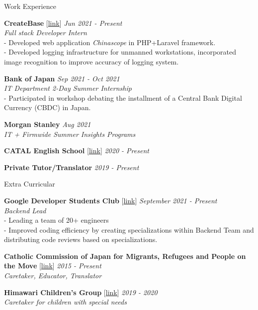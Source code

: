 \documentclass{resume} %
\begin{document}
\begin{rSection}{Work Experience}

{\bf CreateBase }[\href{https://createbase.work/}{link}] \hfill {\em Jun 2021 - Present} \\
{\textit{Full stack Developer Intern }}
\\- Developed web application \textit{Chinascope} in PHP+Laravel framework. 
\\- Developed logging infrastructure for unmanned workstations, incorporated image recognition to improve accuracy of logging system. 

{\bf Bank of Japan} \hfill {\em Sep 2021 - Oct 2021} \\
{\textit{IT Department 2-Day Summer Internship}}
\\- Participated in workshop debating the installment of a Central Bank Digital Currency (CBDC) in Japan.

{\bf Morgan Stanley} \hfill {\em Aug 2021} \\
{\textit{IT + Firmwide Summer Insights Programs}}

{\bf CATAL English School }[\href{https://catal.jp/}{link}] \hfill {\em 2020 - Present}

{\bf Private Tutor/Translator} \hfill {\em 2019 - Present} 

\end{rSection}

\begin{rSection}{Extra Curricular}

{\bf Google Developer Students Club }[\href{https://gdsc.community.dev/waseda-university/}{link}] \hfill {\em September 2021 - Present} \\
{\textit{Backend Lead}}\\
- Leading a team of 20+ engineers
\\- Improved coding efficiency by creating specializations within Backend Team and distributing code reviews based on specializations.


{\bf Catholic Commission of Japan for Migrants, Refugees and People on the
Move} [\href{https://www.cbcj.catholic.jp/english/japan/comt/migrantsrefugees_e/}{link}] \hfill {\em 2015 - Present} \\
{\textit{Caretaker, Educator, Translator}}

{\bf Himawari Children's Group } [\href{https://www.waseda.jp/inst/wavoc/news/2020/04/01/5313/}{link}] \hfill {\em 2019 - 2020} \\
{\textit{Caretaker for children with special needs}}

\end{rSection}
\end{document}
